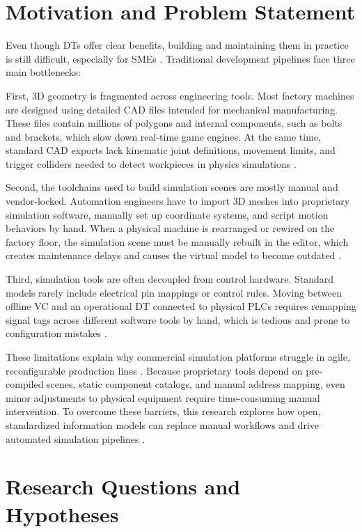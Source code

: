 \section{Motivation and Problem Statement}

Even though \glspl{DT} offer clear benefits, building and maintaining them in practice is still difficult, especially for \glspl{SME} \cite{Schaper2025}. Traditional development pipelines face three main bottlenecks:

First, 3D geometry is fragmented across engineering tools. Most factory machines are designed using detailed \gls{CAD} files intended for mechanical manufacturing. These files contain millions of polygons and internal components, such as bolts and brackets, which slow down real-time game engines. At the same time, standard \gls{CAD} exports lack kinematic joint definitions, movement limits, and trigger colliders needed to detect workpieces in physics simulations \cite{Chowdhury2025}.

Second, the toolchains used to build simulation scenes are mostly manual and vendor-locked. Automation engineers have to import 3D meshes into proprietary simulation software, manually set up coordinate systems, and script motion behaviors by hand. When a physical machine is rearranged or rewired on the factory floor, the simulation scene must be manually rebuilt in the editor, which creates maintenance delays and causes the virtual model to become outdated \cite{Alexopoulos2025}.

Third, simulation tools are often decoupled from control hardware. Standard models rarely include electrical pin mappings or control rules. Moving between offline \gls{VC} and an operational \gls{DT} connected to physical \glspl{PLC} requires remapping signal tags across different software tools by hand, which is tedious and prone to configuration mistakes \cite{Striffler2023}.

These limitations explain why commercial simulation platforms struggle in agile, reconfigurable production lines \cite{Rocha2024}. Because proprietary tools depend on pre-compiled scenes, static component catalogs, and manual address mapping, even minor adjustments to physical equipment require time-consuming manual intervention. To overcome these barriers, this research explores how open, standardized information models can replace manual workflows and drive automated simulation pipelines \cite{Luder2020}.

\section{Research Questions and Hypotheses}

